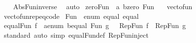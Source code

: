 \begin{isabellebody}
%
\isadelimproof
\ \ %
\endisadelimproof
%
\isatagproof
{}\isamarkupfalse%
\ Abs{\isacharunderscore}{\kern0pt}Fun{\isacharunderscore}{\kern0pt}inverse\ \isamarkupfalse%
\ auto%
\endisatagproof
{\isafoldproof}%
%
\isadelimproof
\isanewline
%
\endisadelimproof
\isanewline
{}\isamarkupfalse%
\ zero{\isacharunderscore}{\kern0pt}Fun\ {\isacharcolon}{\kern0pt}{\isacharcolon}{\kern0pt}\ {\isachardoublequoteopen}{\isacharparenleft}{\kern0pt}{\isacharprime}{\kern0pt}a{\isacharcomma}{\kern0pt}\ {\isacharprime}{\kern0pt}b{\isacharcolon}{\kern0pt}{\isacharcolon}{\kern0pt}zero{\isacharparenright}{\kern0pt}\ Fun{\isachardoublequoteclose}\ \ {}%
\isadelimproof
%
\endisadelimproof
%
\isatagproof
\isacommand{{\isachardot}{\kern0pt}}\isamarkupfalse%
%
\endisatagproof
{\isafoldproof}%
%
\isadelimproof
%
\endisadelimproof
\isanewline
\isanewline
{}\isamarkupfalse%
\ vec{\isacharunderscore}{\kern0pt}to{\isacharunderscore}{\kern0pt}fun\isanewline
\isanewline
{}\isamarkupfalse%
\ vec{\isacharunderscore}{\kern0pt}to{\isacharunderscore}{\kern0pt}fun{\isachardot}{\kern0pt}rep{\isacharunderscore}{\kern0pt}eq{\isacharbrackleft}{\kern0pt}code{\isacharbrackright}{\kern0pt}\isanewline
\isanewline
{}\isamarkupfalse%
\ Fun\ {\isacharcolon}{\kern0pt}{\isacharcolon}{\kern0pt}\ {\isacharparenleft}{\kern0pt}enum{\isacharcomma}{\kern0pt}\ equal{\isacharparenright}{\kern0pt}\ equal\isanewline
{}\isanewline
{}\isamarkupfalse%
\ {\isachardoublequoteopen}equal{\isacharunderscore}{\kern0pt}Fun\ {\isacharparenleft}{\kern0pt}f\ {\isacharcolon}{\kern0pt}{\isacharcolon}{\kern0pt}\ {\isacharparenleft}{\kern0pt}{\isacharprime}{\kern0pt}a{\isacharcolon}{\kern0pt}{\isacharcolon}{\kern0pt}enum{\isacharcomma}{\kern0pt}\ {\isacharprime}{\kern0pt}b{\isacharcolon}{\kern0pt}{\isacharcolon}{\kern0pt}equal{\isacharparenright}{\kern0pt}\ Fun{\isacharparenright}{\kern0pt}\ g\ {\isacharequal}{\kern0pt}\ \ {\isacharparenleft}{\kern0pt}Rep{\isacharunderscore}{\kern0pt}Fun\ f\ {\isacharequal}{\kern0pt}\ Rep{\isacharunderscore}{\kern0pt}Fun\ g{\isacharparenright}{\kern0pt}{\isachardoublequoteclose}\isanewline
{}\isamarkupfalse%
\ \isanewline
%
\isadelimproof
\ \ %
\endisadelimproof
%
\isatagproof
{}\isamarkupfalse%
\ standard\ {\isacharparenleft}{\kern0pt}auto\ simp{\isacharcolon}{\kern0pt}\ equal{\isacharunderscore}{\kern0pt}Fun{\isacharunderscore}{\kern0pt}def\ Rep{\isacharunderscore}{\kern0pt}Fun{\isacharunderscore}{\kern0pt}inject{\isacharparenright}{\kern0pt}%

\end{isabellebody}
